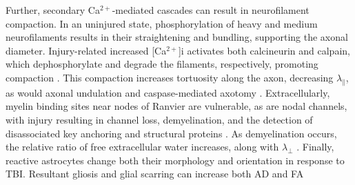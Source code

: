 \documentclass[12pt]{article}
\begin{document}
Further, secondary Ca$^{2+}$-mediated cascades can result in neurofilament compaction. In an uninjured state, phosphorylation of heavy and medium neurofilaments results in their straightening and bundling, supporting the axonal diameter. Injury-related increased [Ca$^{2+}$]i activates both calcineurin and calpain, which dephosphorylate and degrade the filaments, respectively, promoting compaction \parencite{krieg2023IdentifyingPhenotypesDiffuse,pant1988DephosphorylationNeurofilamentProteins,chen1999EvolutionNeurofilamentSubtype}. This compaction increases tortuosity along the axon, decreasing $\lambda_\parallel$, as would axonal undulation and caspase-mediated axotomy \parencite{svandova2023MakingHeadCaspases}. Extracellularly, myelin binding sites near nodes of Ranvier are vulnerable, as are nodal channels, with injury resulting in channel loss, demyelination, and the detection of disassociated key anchoring and structural proteins \parencite{song2022ConcussionLeadsWidespread,zhu2016NodalTotalAxonal,krieg2023IdentifyingPhenotypesDiffuse}. As demyelination occurs, the relative ratio of free extracellular water increases, along with $\lambda_\perp$ \parencite{mayer2010ProspectiveDiffusionTensor}. Finally, reactive astrocytes change both their morphology and orientation in response to TBI. Resultant gliosis and glial scarring can increase both AD and FA \parencite{budde2011ContributionGliosisDiffusion,churchill2017WhiteMatterMicrostructure,cieri2025AstrocytesReactiveAstrogliosis,mira2021TraumaticBrainInjury,sofroniew2009MolecularDissectionReactive}

\end{document}

